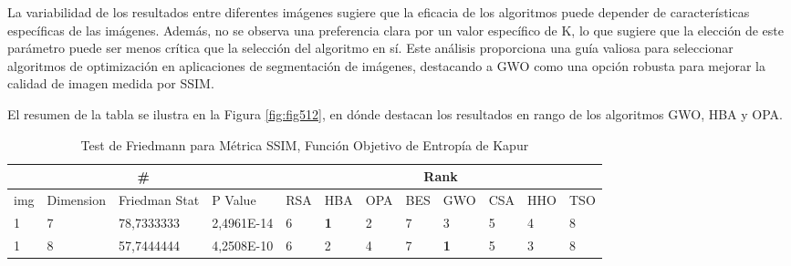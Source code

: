\documentclass[conference]{IEEEtran}
\begin{document}
\noindent La variabilidad de los resultados entre diferentes imágenes sugiere que la eficacia de los algoritmos puede depender de características específicas de las imágenes. Además, no se observa una preferencia clara por un valor específico de K, lo que sugiere que la elección de este parámetro puede ser menos crítica que la selección del algoritmo en sí. Este análisis proporciona una guía valiosa para seleccionar algoritmos de optimización en aplicaciones de segmentación de imágenes, destacando a GWO como una opción robusta para mejorar la calidad de imagen medida por SSIM.

\noindent El resumen de la tabla se ilustra en la Figura \ref{fig:fig512}, en dónde destacan los resultados en rango de los algoritmos GWO, HBA y OPA.
\begin{table}[]
	\centering
	\caption{Test de Friedmann para Métrica SSIM, Función Objetivo de Entropía de Kapur}
	\begin{tabular}{|llll|llllllll|}
		\hline
		\multicolumn{4}{|c|}{\#} & \multicolumn{8}{c|}{Rank} \\ \hline
		\multicolumn{1}{|l|}{img} & \multicolumn{1}{l|}{Dimension} & \multicolumn{1}{l|}{Friedman Stat} & P Value    & \multicolumn{1}{l|}{RSA} & \multicolumn{1}{l|}{HBA}        & \multicolumn{1}{l|}{OPA}        & \multicolumn{1}{l|}{BES} & \multicolumn{1}{l|}{GWO}        & \multicolumn{1}{l|}{CSA}        & \multicolumn{1}{l|}{HHO}        & TSO                    \\ \hline                                                                                                                                                                       
		\multicolumn{1}{|l|}{1}   & \multicolumn{1}{l|}{7}         & \multicolumn{1}{l|}{78,7333333}    & 2,4961E-14 & \multicolumn{1}{l|}{6}   & \multicolumn{1}{l|}{\textbf{1}} & \multicolumn{1}{l|}{2}          & \multicolumn{1}{l|}{7}   & \multicolumn{1}{l|}{3}          & \multicolumn{1}{l|}{5}          & \multicolumn{1}{l|}{4}          & 8                      \\ \hline
		\multicolumn{1}{|l|}{1}   & \multicolumn{1}{l|}{8}         & \multicolumn{1}{l|}{57,7444444}    & 4,2508E-10 & \multicolumn{1}{l|}{6}   & \multicolumn{1}{l|}{2}          & \multicolumn{1}{l|}{4}          & \multicolumn{1}{l|}{7}   & \multicolumn{1}{l|}{\textbf{1}} & \multicolumn{1}{l|}{5}          & \multicolumn{1}{l|}{3}          & 8                      \\ \hline

\end{tabular}
\end{table}
\end{document}
